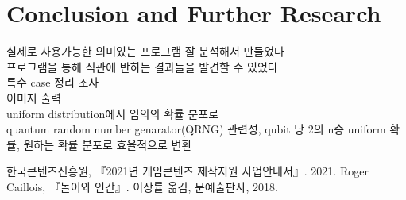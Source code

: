 \documentclass[11pt]{article}
\begin{document}
\section{Conclusion and Further Research}
실제로 사용가능한 의미있는 프로그램 잘 분석해서 만들었다\\
프로그램을 통해 직관에 반하는 결과들을 발견할 수 있었다\\
특수 case 정리 조사\\
이미지 출력\\
uniform distribution에서 임의의 확률 분포로\\
quantum random number genarator(QRNG) 관련성, qubit 당 2의 n승 uniform 확률, 원하는 확률 분포로 효율적으로 변환\\

\begin{thebibliography}{99}
한국콘텐츠진흥원, 『2021년 게임콘텐츠 제작지원 사업안내서』. 2021.
Roger Caillois, 『놀이와 인간』. 이상률 옮김, 문예출판사, 2018.

\end{thebibliography}
\end{document}
